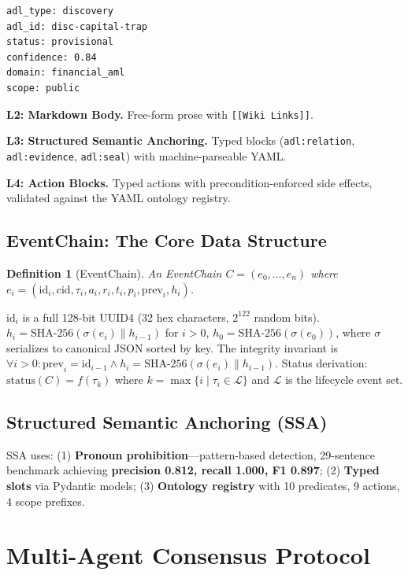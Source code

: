 \documentclass[11pt,a4paper]{article}
\newtheorem{definition}{Definition}[section]
\theoremstyle{remark}
\begin{document}
\begin{lstlisting}[caption={L1 YAML example}]
adl_type: discovery
adl_id: disc-capital-trap
status: provisional
confidence: 0.84
domain: financial_aml
scope: public
\end{lstlisting}

\textbf{L2: Markdown Body.} Free-form prose with \texttt{[[Wiki Links]]}.

\textbf{L3: Structured Semantic Anchoring.} Typed blocks (\texttt{adl:relation}, \texttt{adl:evidence}, \texttt{adl:seal}) with machine-parseable YAML.

\textbf{L4: Action Blocks.} Typed actions with precondition-enforced side effects, validated against the YAML ontology registry.

\subsection{EventChain: The Core Data Structure}

\begin{definition}[EventChain]
An EventChain $C = (e_0, \ldots, e_n)$ where $e_i = (\mathrm{id}_i, \mathrm{cid}, \tau_i, a_i, r_i, t_i, p_i, \mathrm{prev}_i, h_i)$.
\end{definition}

$\mathrm{id}_i$ is a full 128-bit UUID4 (32 hex characters, $2^{122}$ random bits). $h_i = \mathrm{SHA\text{-}256}(\sigma(e_i) \parallel h_{i-1})$ for $i>0$, $h_0 = \mathrm{SHA\text{-}256}(\sigma(e_0))$, where $\sigma$ serializes to canonical JSON sorted by key. The integrity invariant is $\forall i>0: \mathrm{prev}_i = \mathrm{id}_{i-1} \land h_i = \mathrm{SHA\text{-}256}(\sigma(e_i) \parallel h_{i-1})$. Status derivation: $\mathrm{status}(C) = f(\tau_k)$ where $k = \max\{i \mid \tau_i \in \mathcal{L}\}$ and $\mathcal{L}$ is the lifecycle event set.

\subsection{Structured Semantic Anchoring (SSA)}

SSA uses: (1) \textbf{Pronoun prohibition}---pattern-based detection, 29-sentence benchmark achieving \textbf{precision 0.812, recall 1.000, F1 0.897}; (2) \textbf{Typed slots} via Pydantic models; (3) \textbf{Ontology registry} with 10 predicates, 9 actions, 4 scope prefixes.

\section{Multi-Agent Consensus Protocol}
\label{sec:consensus}
\end{document}
